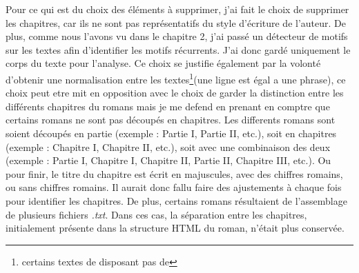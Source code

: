 Pour ce qui est du choix des éléments à supprimer, j'ai fait le choix de supprimer les chapitres, car ils ne sont pas représentatifs du style d'écriture de l'auteur. De plus, comme nous l'avons vu dans le chapitre 2, j'ai passé un détecteur de motifs sur les textes afin d'identifier les motifs récurrents. J'ai donc gardé uniquement le corps du texte pour l'analyse. Ce choix se justifie également par la volonté d'obtenir une normalisation entre les textes\footnote{certains textes de disposant pas de }(une ligne est égal a une phrase), ce choix peut etre mit en opposition avec le choix de garder la distinction entre les différents chapitres du romans mais je me defend en prenant en comptre que certains romans ne sont pas découpés en chapitres. Les differents romans sont soient découpés en partie (exemple : Partie I, Partie II, etc.), soit en chapitres (exemple : Chapitre I, Chapitre II, etc.), soit avec une combinaison des deux (exemple : Partie I, Chapitre I, Chapitre II, Partie II, Chapitre III, etc.). Ou pour finir, le titre du chapitre est écrit en majuscules, avec des chiffres romains, ou sans chiffres romains. Il aurait donc fallu faire des ajustements à chaque fois pour identifier les chapitres. De plus, certains romans résultaient de l'assemblage de plusieurs fichiers \textsl{.txt}. Dans ces cas, la séparation entre les chapitres, initialement présente dans la structure HTML du roman, n'était plus conservée.